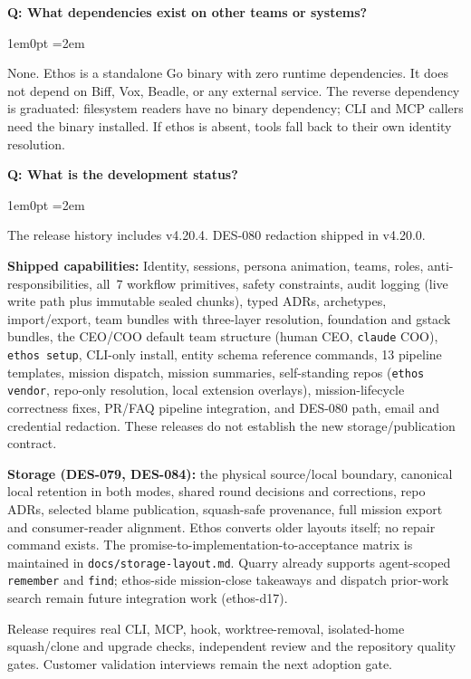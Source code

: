 \documentclass[11pt,letterpaper]{article}
\newcommand{\fpath}[1]{\nolinkurl{#1}}
\newcounter{faqnum}
\newenvironment{faqpair}[1]{%
  \needspace{4\baselineskip}%
  \vspace{0.5em}%
  \refstepcounter{faqnum}%
  \noindent\textbf{\color{SectionBlue}Q\thefaqnum: #1}\par\nopagebreak[4]%
  \vspace{0.2em}%
  \begin{adjustwidth}{1em}{0pt}%
  \setlength{\parindent}{0pt}%
  \emergencystretch=2em%
}{%
  \end{adjustwidth}%
  \vspace{0.5em}%
}
\begin{document}
\begin{faqpair}{What dependencies exist on other teams or systems?}
None. Ethos is a standalone Go binary with zero runtime dependencies. It does not depend on Biff, Vox, Beadle, or any external service. The reverse dependency is graduated: filesystem readers have no binary dependency; CLI and MCP callers need the binary installed. If ethos is absent, tools fall back to their own identity resolution.
\end{faqpair}

\begin{faqpair}{What is the development status?}
The release history includes v4.20.4. DES-080 redaction shipped in v4.20.0.

\textbf{Shipped capabilities:} Identity, sessions, persona animation, teams, roles, anti-responsibilities, all~7 workflow primitives, safety constraints, audit logging (live write path plus immutable sealed chunks), typed ADRs, archetypes, import\slash export, team bundles with three-layer resolution, foundation and gstack bundles, the CEO/COO default team structure (human CEO, {\small\texttt{claude}} COO), {\small\texttt{ethos setup}}, CLI-only install, entity schema reference commands, 13 pipeline templates, mission dispatch, mission summaries, self-standing repos ({\small\texttt{ethos vendor}}, repo-only resolution, local extension overlays), mission-lifecycle correctness fixes, PR/FAQ pipeline integration, and DES-080 path, email and credential redaction. These releases do not establish the new storage/publication contract.

\textbf{Storage (DES-079, DES-084):} the physical source/local boundary, canonical local retention in both modes, shared round decisions and corrections, repo ADRs, selected blame publication, squash-safe provenance, full mission export and consumer-reader alignment. Ethos converts older layouts itself; no repair command exists. The promise-to-implementation-to-acceptance matrix is maintained in {\small\fpath{docs/storage-layout.md}}. Quarry already supports agent-scoped {\small\texttt{remember}} and {\small\texttt{find}}; ethos-side mission-close takeaways and dispatch prior-work search remain future integration work (ethos-d17).

Release requires real CLI, MCP, hook, worktree-removal, isolated-home squash/clone and upgrade checks, independent review and the repository quality gates. Customer validation interviews remain the next adoption gate.
\end{faqpair}
\end{document}
